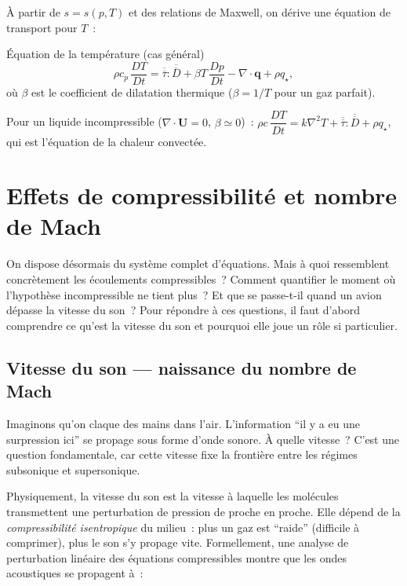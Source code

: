 \documentclass[11pt,a4paper]{report}
\newcommand{\DD}[1]{\dfrac{D #1}{Dt}}
\newcommand{\ten}[1]{\overline{\overline{#1}}}   %
\begin{document}
\`A partir de $s = s(p,T)$ et des relations de Maxwell, on d\'erive une \'equation de
transport pour $T$~:

\begin{importantbox}{\'Equation de la temp\'erature (cas g\'en\'eral)}
\[
  \rho c_p\,\DD{T}
  = \ten{\tau}:\ten{D}
    + \beta T\,\DD{p}
    - \nabla\cdot\bm{q}
    + \rho q_\star,
\]
o\`u $\beta$ est le coefficient de dilatation thermique ($\beta = 1/T$ pour un gaz parfait).
\end{importantbox}

Pour un liquide incompressible ($\nabla\cdot\bm{U}=0$, $\beta \simeq 0$)~:
$\rho c\,\DD{T} = k\nabla^2 T + \ten{\tau}:\ten{D} + \rho q_\star$,
qui est l'\'equation de la chaleur convect\'ee.

\section{Effets de compressibilit\'e et nombre de Mach}

On dispose d\'esormais du syst\`eme complet d'\'equations. Mais \`a quoi ressemblent concr\`etement les \'ecoulements compressibles~? Comment quantifier le moment o\`u l'hypoth\`ese incompressible ne tient plus~? Et que se passe-t-il quand un avion d\'epasse la vitesse du son~? Pour r\'epondre \`a ces questions, il faut d'abord comprendre ce qu'est la vitesse du son et pourquoi elle joue un r\^ole si particulier.

\subsection{Vitesse du son --- naissance du nombre de Mach}

Imaginons qu'on claque des mains dans l'air. L'information ``il y a eu une surpression ici'' se propage sous forme d'onde sonore. \`A quelle vitesse~? C'est une question fondamentale, car cette vitesse fixe la fronti\`ere entre les r\'egimes subsonique et supersonique.

Physiquement, la vitesse du son est la vitesse \`a laquelle les mol\'ecules transmettent une perturbation de pression de proche en proche. Elle d\'epend de la \emph{compressibilit\'e isentropique} du milieu~: plus un gaz est ``raide'' (difficile \`a comprimer), plus le son s'y propage vite. Formellement, une analyse de perturbation lin\'eaire des \'equations compressibles montre que les ondes acoustiques se propagent \`a~:
\end{document}
